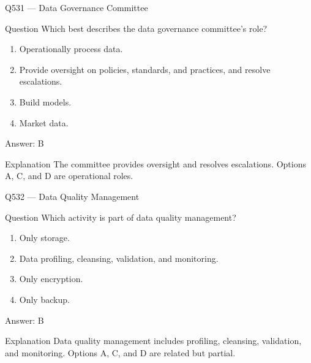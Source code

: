 \documentclass[aspectratio=169,8pt]{beamer}
\begin{document}
	\begin{frame}{Q531 --- Data Governance Committee}
		\begin{block}{Question}
			Which best describes the data governance committee's role?
			\begin{enumerate}
				\item Operationally process data.
				\item Provide oversight on policies, standards, and practices, and resolve escalations.
				\item Build models.
				\item Market data.
			\end{enumerate}
		\end{block}
		\begin{exampleblock}{Answer: B}\end{exampleblock}
		\begin{block}{Explanation}
			The committee provides oversight and resolves escalations. Options A, C, and D are operational roles.
		\end{block}
	\end{frame}
	
	\begin{frame}{Q532 --- Data Quality Management}
		\begin{block}{Question}
			Which activity is part of data quality management?
			\begin{enumerate}
				\item Only storage.
				\item Data profiling, cleansing, validation, and monitoring.
				\item Only encryption.
				\item Only backup.
			\end{enumerate}
		\end{block}
		\begin{exampleblock}{Answer: B}\end{exampleblock}
		\begin{block}{Explanation}
			Data quality management includes profiling, cleansing, validation, and monitoring. Options A, C, and D are related but partial.
		\end{block}
	\end{frame}
	
\end{document}
